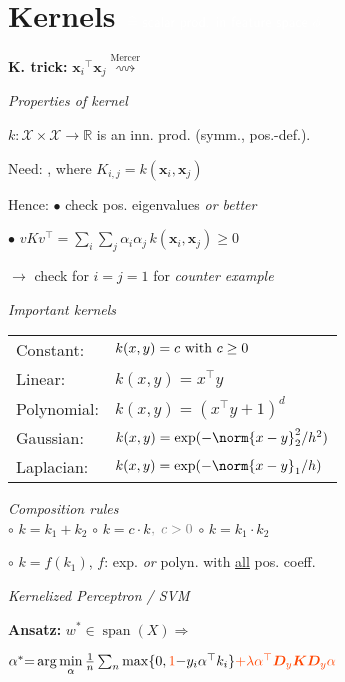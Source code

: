\section{Kernels
\hfill\normalfont $\color{section-text-color}\widehat{=} \text{ \sffamily scalar prod. in feature space } \phi$}

\textbf{K. trick:}\;
$\bm{x}_i\!^\top \bm{x}_j \overset{\text{Mercer}}{\rightsquigarrow}$

\emph{Properties of kernel}

$k: \mathcal{X} \times \mathcal{X} \rightarrow \mathbb{R}$ is an inn. prod. (symm., pos.-def.).

Need: \enskip {}, \enskip where $K_{i,j} = k(\bm{x}_i,\bm{x}_j)$

Hence:
\enskip $\bullet$ check pos. eigenvalues \textit{or better} \par
\enskip $\bullet$ $vKv^\top = \sum_i\sum_j \alpha_i\alpha_j\, k(\bm{x}_i,\bm{x}_j) \geq 0$ \par
\enskip $\to$ check for $i\!=\!j\!=\!1$ for \textit{counter example}

\emph{Important kernels}
{
\begin{tabular}{@{}>{\normalcolor}l l}
	Constant:	& $k(x,y)=c \text{ \normalcolor with } c \geq 0$\\
	Linear: 	& $k(x,y)=x^\top y$\\
	Polynomial:	& $k(x,y)=(x^\top y + 1)^d$\\
	Gaussian:	& $k(x,y) = \exp(-\norm{x-y}_2^2/h^2)$\\
	Laplacian:	& $k(x,y) = \exp(-\norm{x-y}_1/h)$
\end{tabular}
}

\emph{Composition rules}\\
$\circ$ $k=k_1+k_2$
\enskip
$\circ$ $k=c\cdot k${\footnotesize $\color{gray},\; c>0$}
\enskip
$\circ$ $k=k_1\!\cdot\! k_2$

$\circ$ $k=f(k_1)${\footnotesize \color{gray}, $f$: exp. \textit{or} polyn. with \underline{all} pos. coeff.}

\emph{Kernelized Perceptron / \color{OrangeRed} SVM}
\vspace{-1pt}

\textbf{Ansatz:} $w^* \in \operatorname{span}(X) \Rightarrow$ 

\vspace{-1pt}
{\small $\alpha^\ast {=}
\arg\min\limits_\alpha \frac{1}{n}\sum_n \max\{ 0, {\color{OrangeRed}1}{-}y_i\alpha^\top k_i \} {\color{OrangeRed}+ \lambda\alpha^\top \bm{D}_y\bm{K}\bm{D}_y \alpha}$}

